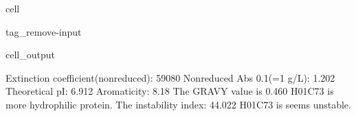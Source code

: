 \documentclass[letterpaper,10pt,english]{jupyterBook}
\begin{document}
\begin{sphinxuseclass}{cell}
\begin{sphinxuseclass}{tag_remove-input}
\begin{sphinxVerbatimOutput}
\begin{sphinxuseclass}{cell_output}
\begin{sphinxVerbatim}[commandchars=\\\{\}]
\PYGZsh{} Extinction coefficient(non\PYGZhy{}reduced): \PYGZhy{}\PYGZhy{}\PYGZhy{}\PYGZhy{}\PYGZhy{}\PYGZhy{}\PYGZhy{}\PYGZhy{}\PYGZhy{}\PYGZhy{}\PYGZhy{}\PYGZhy{}\PYGZhy{}\PYGZhy{}\PYGZhy{}\PYGZhy{}\PYGZhy{}\PYGZhy{}\PYGZhy{}\PYGZhy{}\PYGZhy{}\PYGZhy{}59080
\PYGZsh{} Non\PYGZhy{}reduced Abs 0.1\PYGZpc{}(=1 g/L): \PYGZhy{}\PYGZhy{}\PYGZhy{}\PYGZhy{}\PYGZhy{}\PYGZhy{}\PYGZhy{}\PYGZhy{}\PYGZhy{}\PYGZhy{}\PYGZhy{}\PYGZhy{}\PYGZhy{}\PYGZhy{}\PYGZhy{}\PYGZhy{}\PYGZhy{}\PYGZhy{}\PYGZhy{}\PYGZhy{}\PYGZhy{}\PYGZhy{}\PYGZhy{}\PYGZhy{}\PYGZhy{}\PYGZhy{}\PYGZhy{}\PYGZhy{}\PYGZhy{}1.202
\PYGZsh{} Theoretical pI: \PYGZhy{}\PYGZhy{}\PYGZhy{}\PYGZhy{}\PYGZhy{}\PYGZhy{}\PYGZhy{}\PYGZhy{}\PYGZhy{}\PYGZhy{}\PYGZhy{}\PYGZhy{}\PYGZhy{}\PYGZhy{}\PYGZhy{}\PYGZhy{}\PYGZhy{}\PYGZhy{}\PYGZhy{}\PYGZhy{}\PYGZhy{}\PYGZhy{}\PYGZhy{}\PYGZhy{}\PYGZhy{}\PYGZhy{}\PYGZhy{}\PYGZhy{}\PYGZhy{}\PYGZhy{}\PYGZhy{}\PYGZhy{}\PYGZhy{}\PYGZhy{}\PYGZhy{}\PYGZhy{}\PYGZhy{}\PYGZhy{}\PYGZhy{}\PYGZhy{}\PYGZhy{}\PYGZhy{}\PYGZhy{}6.912
\PYGZsh{} Aromaticity: \PYGZhy{}\PYGZhy{}\PYGZhy{}\PYGZhy{}\PYGZhy{}\PYGZhy{}\PYGZhy{}\PYGZhy{}\PYGZhy{}\PYGZhy{}\PYGZhy{}\PYGZhy{}\PYGZhy{}\PYGZhy{}\PYGZhy{}\PYGZhy{}\PYGZhy{}\PYGZhy{}\PYGZhy{}\PYGZhy{}\PYGZhy{}\PYGZhy{}\PYGZhy{}\PYGZhy{}\PYGZhy{}\PYGZhy{}\PYGZhy{}\PYGZhy{}\PYGZhy{}\PYGZhy{}\PYGZhy{}\PYGZhy{}\PYGZhy{}\PYGZhy{}\PYGZhy{}\PYGZhy{}\PYGZhy{}\PYGZhy{}\PYGZhy{}\PYGZhy{}\PYGZhy{}\PYGZhy{}\PYGZhy{}\PYGZhy{}\PYGZhy{}\PYGZhy{}8.18\PYGZpc{}
\PYGZsh{} The GRAVY value is \PYGZhy{}\PYGZhy{}\PYGZhy{}\PYGZhy{}\PYGZhy{}\PYGZhy{}\PYGZhy{}\PYGZhy{}\PYGZhy{}\PYGZhy{}\PYGZhy{}\PYGZhy{}\PYGZhy{}\PYGZhy{}\PYGZhy{}\PYGZhy{}\PYGZhy{}\PYGZhy{}\PYGZhy{}\PYGZhy{}\PYGZhy{}\PYGZhy{}\PYGZhy{}\PYGZhy{}\PYGZhy{}\PYGZhy{}\PYGZhy{}\PYGZhy{}\PYGZhy{}\PYGZhy{}\PYGZhy{}\PYGZhy{}\PYGZhy{}\PYGZhy{}\PYGZhy{}\PYGZhy{}\PYGZhy{}\PYGZhy{}\PYGZhy{}\PYGZhy{}0.460
  H\PYGZus{}01C73 is more hydrophilic protein.
\PYGZsh{} The instability index: \PYGZhy{}\PYGZhy{}\PYGZhy{}\PYGZhy{}\PYGZhy{}\PYGZhy{}\PYGZhy{}\PYGZhy{}\PYGZhy{}\PYGZhy{}\PYGZhy{}\PYGZhy{}\PYGZhy{}\PYGZhy{}\PYGZhy{}\PYGZhy{}\PYGZhy{}\PYGZhy{}\PYGZhy{}\PYGZhy{}\PYGZhy{}\PYGZhy{}\PYGZhy{}\PYGZhy{}\PYGZhy{}\PYGZhy{}\PYGZhy{}\PYGZhy{}\PYGZhy{}\PYGZhy{}\PYGZhy{}\PYGZhy{}\PYGZhy{}\PYGZhy{}\PYGZhy{}44.022
  H\PYGZus{}01C73 is seems unstable.
\end{sphinxVerbatim}

\end{sphinxuseclass}\end{sphinxVerbatimOutput}

\end{sphinxuseclass}
\end{sphinxuseclass}
\end{document}
